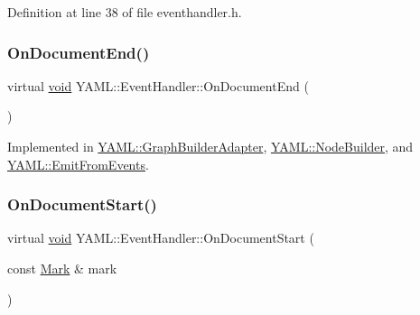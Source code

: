 Definition at line 38 of file eventhandler.\+h.

\mbox{\label{class_y_a_m_l_1_1_event_handler_afc0d547e87f9c1f63ba8087aabd7e34a}} 
\subsubsection{\texorpdfstring{OnDocumentEnd()}{OnDocumentEnd()}}
{\footnotesize\ttfamily virtual \mbox{\hyperlink{glad_8h_a950fc91edb4504f62f1c577bf4727c29}{void}} Y\+A\+M\+L\+::\+Event\+Handler\+::\+On\+Document\+End (\begin{DoxyParamCaption}{ }\end{DoxyParamCaption})\hspace{0.3cm}{\ttfamily [pure virtual]}}



Implemented in \mbox{\hyperlink{class_y_a_m_l_1_1_graph_builder_adapter_a9f0b8ba153afc80ba449dea7a17d2f1f}{Y\+A\+M\+L\+::\+Graph\+Builder\+Adapter}}, \mbox{\hyperlink{class_y_a_m_l_1_1_node_builder_ae97951424f9c611ea4770dc9fb18f41b}{Y\+A\+M\+L\+::\+Node\+Builder}}, and \mbox{\hyperlink{class_y_a_m_l_1_1_emit_from_events_ae9e5f8acf7b2a9dfb74967c11e49cb5e}{Y\+A\+M\+L\+::\+Emit\+From\+Events}}.

\mbox{\label{class_y_a_m_l_1_1_event_handler_adb739beb59e227bd320aab1e61bf42e4}} 
\subsubsection{\texorpdfstring{OnDocumentStart()}{OnDocumentStart()}}
{\footnotesize\ttfamily virtual \mbox{\hyperlink{glad_8h_a950fc91edb4504f62f1c577bf4727c29}{void}} Y\+A\+M\+L\+::\+Event\+Handler\+::\+On\+Document\+Start (\begin{DoxyParamCaption}\item[{const \mbox{\hyperlink{struct_y_a_m_l_1_1_mark}{Mark}} \&}]{mark }\end{DoxyParamCaption})\hspace{0.3cm}{\ttfamily [pure virtual]}}




